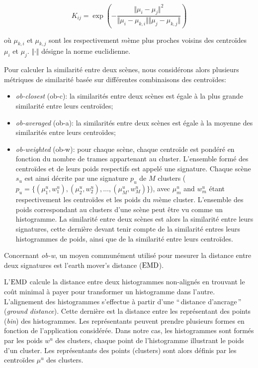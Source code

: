 \begin{equation}
\label{eq:kc}
K_{ij} = \exp\left( - \dfrac{\Vert \mu_i - \mu_j \Vert^2}{\Vert \mu_i - \mu_{k,i} \Vert \Vert \mu_j - \mu_{k,j} \Vert} \right) 
\end{equation} 

où $\mu_{k,i}$ et $\mu_{k,j}$ sont les respectivement $m$ème plus proches voisins des centroïdes $\mu_i$ et $\mu_j$. $\Vert \cdot \Vert$ désigne la norme euclidienne.

Pour calculer la similarité entre deux scènes, nous considérons alors plusieurs métriques de similarité basée sur différentes combinaisons des centroïdes:

\begin{itemize}
\item \emph{ob-closest} (ob-c): la similarités entre deux scènes est égale à la plus grande similarité entre leurs centroïdes;
\item \emph{ob-averaged} (ob-a): la similarités entre deux scènes est égale à la moyenne des similarités entre leurs centroïdes;
\item \emph{ob-weighted} (ob-w): pour chaque scène, chaque centroïde est pondéré en fonction du nombre de trames appartenant au cluster. L'ensemble formé des centroïdes et de leurs poids respectifs est appelé une signature. Chaque scène $s_u$ est ainsi décrite par une signature $p_u$ de $M$ clusters ($p_u=\lbrace(\mu_1^u,w_1^u),(\mu_2^u,w_2^u),\ldots,(\mu_M^u,w_M^u)\rbrace$), avec $\mu_m^u$ and $w_m^u$ étant respectivement les centroïdes et les poids du $m$ème cluster. L'ensemble des poids correspondant au clusters d'une scène peut être vu comme un histogramme. La similarité entre deux scènes est alors la similarité entre leurs signatures, cette dernière  devant tenir compte de la similarité entres leurs histogrammes de poids, ainsi que de la similarité entre leurs centroïdes.
\end{itemize}

Concernant \emph{ob-w}, un moyen communément utilisé pour mesurer la distance entre deux signatures est l'earth mover's distance ($\mathrm{EMD}$). 

L'$\mathrm{EMD}$  calcule la distance entre deux histogrammes non-alignés en trouvant le coût minimal à payer pour transformer un histogramme dans l'autre. L'alignement des histogrammes s'effectue à partir d'une ``\,distance d'ancrage\,'' (\emph{ground distance}). Cette dernière est la distance entre les représentant des points (\emph{bin}) des histogrammes. Les représentants peuvent prendre plusieurs formes en fonction de l'application considérée. Dans notre cas, les histogrammes sont formés par les poids $w^u$ des clusters, chaque point de l'histogramme illustrant le poids d'un cluster. Les représentants des points (clusters) sont alors définis par les centroïdes $\mu^u$ des clusters.

